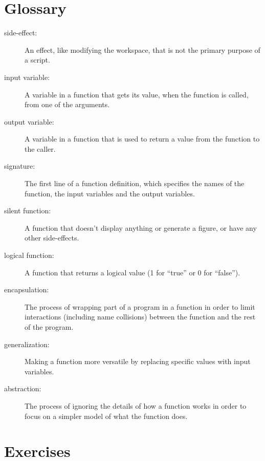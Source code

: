 \section{Glossary}

\begin{description}

\item[side-effect:] An effect, like modifying the workspace, that
is not the primary purpose of a script.

\item[input variable:] A variable in a function that gets its value,
when the function is called, from one of the arguments.

\item[output variable:] A variable in a function that is used to
return a value from the function to the caller.

\item[signature:] The first line of a function definition, which
specifies the names of the function, the input variables and the
output variables.

\item[silent function:] A function that doesn't display anything
or generate a figure, or have any other side-effects.

\item[logical function:] A function that returns a logical value
(1 for ``true'' or 0 for ``false'').

\item[encapsulation:] The process of wrapping part of a program in
a function in order to limit interactions (including name collisions)
between the function and the rest of the program.

\item[generalization:] Making a function more versatile by replacing
specific values with input variables.

\item[abstraction:] The process of ignoring the details of how
a function works in order to focus on a simpler model of what the
function does.

\end{description}


\section{Exercises}

